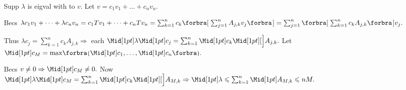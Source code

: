 
Supp $\lambda$ is eigval with to $v.$ Let $v=c_1v_1+\dots+c_nv_n.$\vspace{1pt}\par\quad
Becs $\lambda c_1v_1+\dots+\lambda c_nv_n=c_1Tv_1+\dots+c_nTv_n=\sum_{k=1}^nc_k\BigSbra{\sum_{j=1}^n A_{j,k}v_j}=\sum_{j=1}^n\BigSbra{\sum_{k=1}^nc_kA_{j,k}}v_j.$\vspace{2pt}\par\quad
Thus $\lambda c_j=\sum_{k=1}^n c_kA_{j,k}\Rightarrow$ each $\aMid{\lambda}\aMid{c_j}=\sum_{k=1}^n\aMid{c_k}\aXMid{A_{j,k}}.$ Let $\aMid{c_M}=\max\!\Bra{\aMid{c_1},\dots,\aMid{c_n}}.$\vspace{2pt}\par\quad
Becs $v\neq 0\Rightarrow\aMid{c_M}\neq 0.$ Now $\aMid{\lambda}\aMid{c_M}=\sum_{k=1}^n\aMid{c_k}\aXMid{A_{M,k}}\Rightarrow\aMid{\lambda}\leqslant\sum_{k=1}^n\aMid{A_{M,k}}\leqslant nM.$\PfEnd
\SepLine

